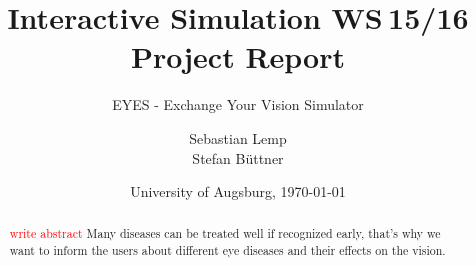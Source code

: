 \documentclass{acm_proc_article-sp}
\newcommand{\todo}[1]{\textcolor{Red}{#1}}
\begin{document}
\title{
Interactive Simulation WS 15/16\\ %
Project Report
}
\subtitle{EYES - Exchange Your Vision Simulator}
\author{
\alignauthor
Sebastian Lemp\\
\alignauthor
Stefan Büttner\\
}

\date{University of Augsburg, \today}




\maketitle
\begin{abstract}
    \todo{write abstract}
    Many diseases can be treated well if recognized early, that's why we want to inform the users about different eye diseases and their effects on the vision.
\end{abstract}

\end{document}
